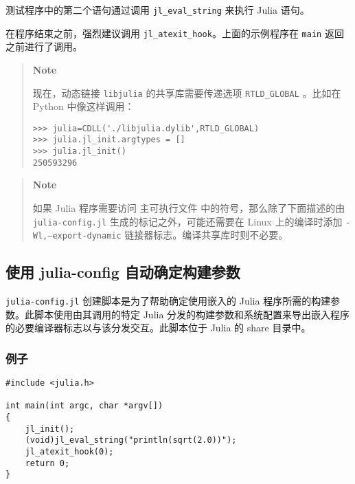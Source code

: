 测试程序中的第二个语句通过调用 \texttt{jl\_eval\_string} 来执行 Julia 语句。



在程序结束之前，强烈建议调用 \texttt{jl\_atexit\_hook}。上面的示例程序在 \texttt{main} 返回之前进行了调用。



\begin{quote}
\textbf{Note}

现在，动态链接 \texttt{libjulia} 的共享库需要传递选项 \texttt{RTLD\_GLOBAL} 。比如在 Python 中像这样调用：


\begin{lstlisting}
>>> julia=CDLL('./libjulia.dylib',RTLD_GLOBAL)
>>> julia.jl_init.argtypes = []
>>> julia.jl_init()
250593296
\end{lstlisting}

\end{quote}


\begin{quote}
\textbf{Note}

如果 Julia 程序需要访问 主可执行文件 中的符号，那么除了下面描述的由 \texttt{julia-config.jl} 生成的标记之外，可能还需要在 Linux 上的编译时添加 \texttt{-Wl,--export-dynamic} 链接器标志。编译共享库时则不必要。

\end{quote}


\hypertarget{122745226345289239}{}


\subsection{使用 julia-config 自动确定构建参数}



\texttt{julia-config.jl} 创建脚本是为了帮助确定使用嵌入的 Julia 程序所需的构建参数。此脚本使用由其调用的特定 Julia 分发的构建参数和系统配置来导出嵌入程序的必要编译器标志以与该分发交互。此脚本位于 Julia 的 share 目录中。



\hypertarget{18305016561534437319}{}


\subsubsection{例子}




\begin{lstlisting}
#include <julia.h>

int main(int argc, char *argv[])
{
    jl_init();
    (void)jl_eval_string("println(sqrt(2.0))");
    jl_atexit_hook(0);
    return 0;
}
\end{lstlisting}



